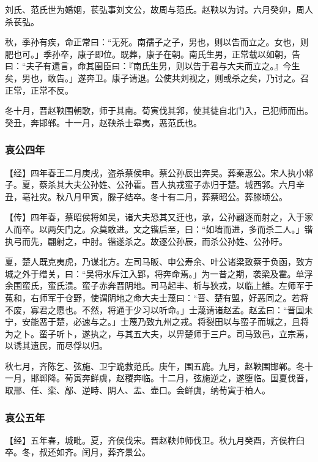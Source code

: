 \documentclass[]{article}
\begin{document}
刘氏、范氏世为婚姻，苌弘事刘文公，故周与范氏。赵鞅以为讨。六月癸卯，周人杀苌弘。

秋，季孙有疾，命正常曰：``无死。南孺子之子，男也，则以告而立之。女也，则肥也可。」季孙卒，康子即位。既葬，康子在朝。南氏生男，正常载以如朝，告曰：``夫子有遗言，命其圉臣曰：『南氏生男，则以告于君与大夫而立之。』今生矣，男也，敢告。」遂奔卫。康子请退。公使共刘视之，则或杀之矣，乃讨之。召正常，正常不反。

冬十月，晋赵鞅围朝歌，师于其南。荀寅伐其郛，使其徒自北门入，己犯师而出。癸丑，奔邯郸。十一月，赵鞅杀士皋夷，恶范氏也。

\hypertarget{header-n3078}{%
\subsubsection{哀公四年}\label{header-n3078}}

【经】四年春王二月庚戌，盗杀蔡侯申。蔡公孙辰出奔吴。葬秦惠公。宋人执小邾子。夏，蔡杀其大夫公孙姓、公孙霍。晋人执戎蛮子赤归于楚。城西郛。六月辛丑，亳社灾。秋八月甲寅，滕子结卒。冬十有二月，葬蔡昭公。葬滕顷公。

【传】四年春，蔡昭侯将如吴，诸大夫恐其又迁也，承，公孙翩逐而射之，入于家人而卒。以两矢门之。众莫敢进。文之锴后至，曰：``如墙而进，多而杀二人。」锴执弓而先，翩射之，中肘。锴遂杀之。故逐公孙辰，而杀公孙姓、公孙盱。

夏，楚人既克夷虎，乃谋北方。左司马眅、申公寿余、叶公诸梁致蔡于负函，致方城之外于缯关，曰：``吴将水斥江入郢，将奔命焉。」为一昔之期，袭梁及霍。单浮余围蛮氏，蛮氏溃。蛮子赤奔晋阴地。司马起丰、析与狄戎，以临上雒。左师军于菟和，右师军于仓野，使谓阴地之命大夫士蔑曰：``晋、楚有盟，好恶同之。若将不废，寡君之愿也。不然，将通于少习以听命。」士蔑请诸赵孟。赵孟曰：``晋国未宁，安能恶于楚，必速与之。」士蔑乃致九州之戎。将裂田以与蛮子而城之，且将为之卜。蛮子听卜，遂执之，与其五大夫，以畀楚师于三户。司马致邑，立宗焉，以诱其遗民，而尽俘以归。

秋七月，齐陈乞、弦施、卫宁跪救范氏。庚午，围五鹿。九月，赵鞅围邯郸。冬十一月，邯郸降。荀寅奔鲜虞，赵稷奔临。十二月，弦施逆之，遂堕临。国夏伐晋，取邢、任、栾、鄗、逆畤、阴人、盂、壶口。会鲜虞，纳荀寅于柏人。

\hypertarget{header-n3086}{%
\subsubsection{哀公五年}\label{header-n3086}}

【经】五年春，城毗。夏，齐侯伐宋。晋赵鞅帅师伐卫。秋九月癸酉，齐侯杵臼卒。冬，叔还如齐。闰月，葬齐景公。
\end{document}
